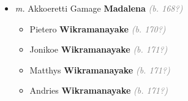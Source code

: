 \documentclass[10pt, openany]{book}
\begin{document}
\begin{itemize}
{\begin{itemize}
\item{\textit{m.} Akkoeretti Gamage \textbf{Madalena} \textcolor{gray}{\textit{(b. 168?)}}   \label{couple:00004208:00004209} \begin{itemize}
\item{Pietero \textbf{Wikramanayake} \textcolor{gray}{\textit{(b. 170?)}}
 }
\item{Jonikoe \textbf{Wikramanayake} \textcolor{gray}{\textit{(b. 171?)}}
 }
\item{Matthys \textbf{Wikramanayake} \textcolor{gray}{\textit{(b. 171?)}}
 }
\item{Andries \textbf{Wikramanayake} \textcolor{gray}{\textit{(b. 171?)}}
 }
\end{itemize}}
\end{itemize}
  }
\end{itemize}
  
\end{document}
